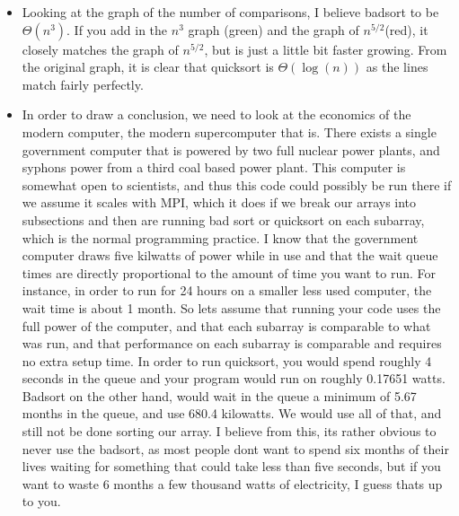 \begin{enumerate}
\begin{enumerate}
\begin{itemize}
    \item Looking at the graph of the number of comparisons, I believe badsort to be $\Theta(n^{3})$. If you add in the $n^{3}$ graph (green) and the graph of $n^{5/2}$(red), it closely matches the graph of $n^{5/2}$, but is just a little bit faster growing. From the original graph, it is clear that quicksort is $\Theta(\log{(n)})$ as the lines match fairly perfectly.
    \item In order to draw a conclusion, we need to look at the economics of the modern computer, the modern supercomputer that is. There exists a single government computer that is powered by two full nuclear power plants, and syphons power from a third coal based power plant. This computer is somewhat open to scientists, and thus this code could possibly be run there if we assume it scales with MPI, which it does if we break our arrays into subsections and then are running bad sort or quicksort on each subarray, which is the normal programming practice. I know that the government computer draws five kilwatts of power while in use and that the wait queue times are directly proportional to the amount of time you want to run. For instance, in order to run for 24 hours on a smaller less used computer, the wait time is about 1 month. So lets assume that running your code uses the full power of the computer, and that each subarray is comparable to what was run, and that performance on each subarray is comparable and requires no extra setup time. In order to run quicksort, you would spend roughly 4 seconds in the queue and your program would run on roughly 0.17651 watts. Badsort on the other hand, would wait in the queue a minimum of 5.67 months in the queue, and use 680.4 kilowatts. We would use all of that, and still not be done sorting our array. I believe from this, its rather obvious to never use the badsort, as most people dont want to spend six months of their lives waiting for something that could take less than five seconds, but if you want to waste 6 months a few thousand watts of electricity, I guess thats up to you.

\end{itemize}
\end{enumerate}
\end{enumerate}
